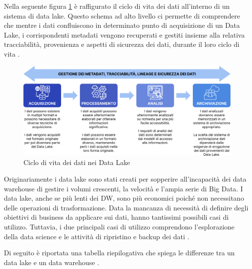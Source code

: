 Nella seguente figura \ref{fig:Data Lake Life Cycle} è raffigurato il ciclo di vita dei dati all'interno di un sistema di data lake. Questo schema ad alto livello ci permette di comprendere che mentre i dati confluiscono in determinato punto di acquisizione di un Data Lake, i corrispondenti metadati vengono recuperati e gestiti insieme alla relativa tracciabilità, provenienza e aspetti di sicurezza dei dati, durante il loro ciclo di vita \cite{data_lake_for_enterprices}.

\begin{figure}[H]
    \centering
    \includegraphics[width=1\linewidth]{figure/capitolo_2/Data Lake Life Cycle.pdf}
    \caption{Ciclo di vita dei dati nei Data Lake}
    \label{fig:Data Lake Life Cycle}
\end{figure}

Originariamente i data lake sono stati creati per sopperire all'incapacità dei data warehouse di gestire i volumi crescenti, la velocità e l'ampia serie di Big Data. I data lake, anche se più lenti dei DW, sono più economici poiché non necessitano delle operazioni di trasformazione. Data la mancanza di necessità di definire degli obiettivi di business da applicare sui dati, hanno tantissimi possibili casi di utilizzo. Tuttavia, i due principali casi di utilizzo comprendono l'esplorazione della data science e le attività di ripristino e backup dei dati \cite{ibm_data_architecture}.

Di seguito è riportata una tabella riepilogativa che spiega le differenze tra un data lake e un data warehouse \cite{aws_data_lake_vs_data_warehouse}.

